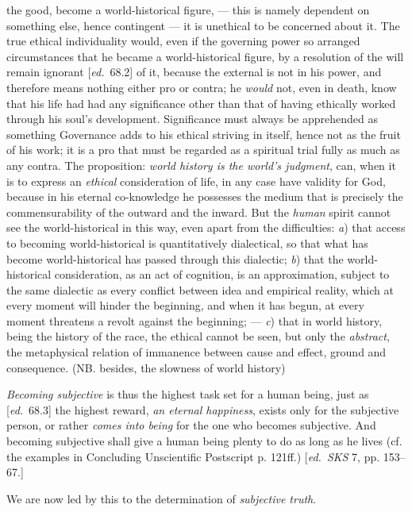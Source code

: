 \documentclass[12pt,a4paper,openany]{book}
\newcommand{\kpage}[1]{\marginnote{\footnotesize\textit{[#1]}}}
\newcommand{\ed}[1]{{\small[\textit{ed.}\ #1]}}
\begin{document}
the good, become a world-historical figure, --- this is namely
dependent on something else, hence contingent --- it is unethical to
be concerned about it. The true ethical individuality would, even if
the governing power so arranged circumstances that he became a world-historical
figure, by a resolution of the will remain ignorant
\ed{68.2} of it, because the external is not in his power, and therefore
means nothing either pro or contra; he \emph{would} not, even in death,
know that his life had had any significance other than that of
having ethically worked through his soul's development. Significance
must always be apprehended as something Governance adds to his ethical striving
in itself, hence not as the fruit of his work; it is a pro
that must be regarded as a spiritual trial fully as much as any contra\kpage{116}.
The proposition: \emph{world history is the world's judgment}, can, when it is to
express an \emph{ethical} consideration of life, in any case have validity for
God, because in his eternal co-knowledge he possesses the medium that is precisely
the commensurability of the outward and the inward. But the
\emph{human} spirit cannot see the world-historical in this way, even
apart from the difficulties: \emph{a}) that access to becoming world-historical
is quantitatively dialectical, so that what has become world-historical
has passed through this dialectic; \emph{b}) that the world-historical
consideration, as an act of cognition, is an approximation, subject to
the same dialectic as every conflict between idea and empirical reality,
which at every moment will hinder the beginning, and when it has begun,
at every moment threatens a revolt against the beginning; --- \emph{c})
that in world history, being the history of the race, the ethical cannot
be seen, but only the \emph{abstract}, the metaphysical relation of immanence
between cause and effect, ground and consequence. (NB.
besides, the slowness of world history)

\emph{Becoming subjective} is thus the highest task set for a
human being, just as \ed{68.3} the highest reward, \emph{an eternal happiness}, exists only
for the subjective person, or rather \emph{comes into being} for the one who becomes subjective.
And becoming subjective shall give a human being plenty to do
as long as he lives (cf. the examples in Concluding Unscientific
Postscript p. 121ff.) \ed{\emph{SKS} 7, pp. 153--67.}

We are now led by this to the determination of \emph{subjective truth}.
\end{document}
